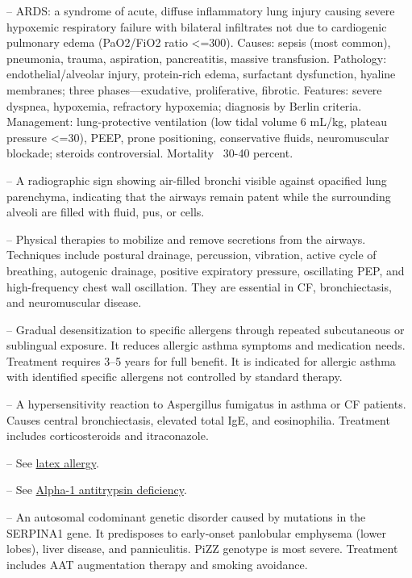 -- ARDS: a syndrome of acute, diffuse inflammatory lung injury causing severe hypoxemic respiratory failure with bilateral infiltrates not due to cardiogenic pulmonary edema (PaO2/FiO2 ratio <=300). Causes: sepsis (most common), pneumonia, trauma, aspiration, pancreatitis, massive transfusion. Pathology: endothelial/alveolar injury, protein-rich edema, surfactant dysfunction, hyaline membranes; three phases—exudative, proliferative, fibrotic. Features: severe dyspnea, hypoxemia, refractory hypoxemia; diagnosis by Berlin criteria. Management: lung-protective ventilation (low tidal volume 6 mL/kg, plateau pressure <=30), PEEP, prone positioning, conservative fluids, neuromuscular blockade; steroids controversial. Mortality ~30-40 percent.

-- A radiographic sign showing air-filled bronchi visible against opacified lung parenchyma, indicating that the airways remain patent while the surrounding alveoli are filled with fluid, pus, or cells.

-- Physical therapies to mobilize and remove secretions from the airways. Techniques include postural drainage, percussion, vibration, active cycle of breathing, autogenic drainage, positive expiratory pressure, oscillating PEP, and high-frequency chest wall oscillation. They are essential in CF, bronchiectasis, and neuromuscular disease.

-- Gradual desensitization to specific allergens through repeated subcutaneous or sublingual exposure. It reduces allergic asthma symptoms and medication needs. Treatment requires 3--5 years for full benefit. It is indicated for allergic asthma with identified specific allergens not controlled by standard therapy.

-- A hypersensitivity reaction to Aspergillus fumigatus in asthma or CF patients. Causes central bronchiectasis, elevated total IgE, and eosinophilia. Treatment includes corticosteroids and itraconazole.

-- See \hyperlink{Latex Allergy}{latex allergy}.

-- See \hyperlink{Alpha-1 Antitrypsin Deficiency}{Alpha-1 antitrypsin deficiency}.

-- An autosomal codominant genetic disorder caused by mutations in the SERPINA1 gene. It predisposes to early-onset panlobular emphysema (lower lobes), liver disease, and panniculitis. PiZZ genotype is most severe. Treatment includes AAT augmentation therapy and smoking avoidance.

